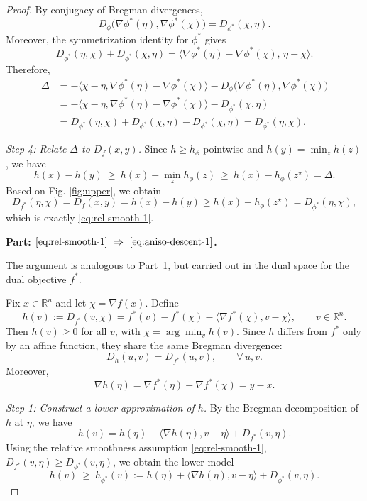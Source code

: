 \documentclass[10pt,a4paper]{amsart}
\providecommand{\paragraph}{}
\begin{document}
\begin{proof}
By conjugacy of Bregman divergences,
\[
D_\phi\bigl(\nabla\phi^*(\eta),\nabla\phi^*(\chi)\bigr)
=
D_{\phi^*}(\chi,\eta).
\]
Moreover, the symmetrization identity for $\phi^*$ gives
\[
D_{\phi^*}(\eta,\chi)+D_{\phi^*}(\chi,\eta)
=
\langle \nabla\phi^*(\eta)-\nabla\phi^*(\chi),\,\eta-\chi\rangle.
\]
Therefore,
\begin{align*}
\Delta
&=
-\langle \chi-\eta,\nabla\phi^*(\eta)-\nabla\phi^*(\chi)\rangle
- D_\phi\bigl(\nabla\phi^*(\eta),\nabla\phi^*(\chi)\bigr)\\
&=
-\langle \chi-\eta,\nabla\phi^*(\eta)-\nabla\phi^*(\chi)\rangle
- D_{\phi^*}(\chi,\eta)\\
&=
D_{\phi^*}(\eta,\chi)+D_{\phi^*}(\chi,\eta)-D_{\phi^*}(\chi,\eta)
= D_{\phi^*}(\eta,\chi).
\end{align*}

\medskip
\paragraph{\em Step 4: Relate $\Delta$ to $D_f(x,y)$.}
Since $h\ge h_\phi$ pointwise and $h(y)=\min_z h(z)$, we have
\[
h(x)-h(y)\ \ge\ h(x)-\min_z h_\phi(z)\ \ge\ h(x)-h_\phi(z^\star)=\Delta.
\]
Based on Fig. \ref{fig:upper}, we obtain
\[
D_{f^*}(\eta,\chi) = D_f(x,y)
= h(x)-h(y)
\ge h(x)-h_\phi(z^\star)
= D_{\phi^*}(\eta,\chi),
\]
which is exactly \eqref{eq:rel-smooth-1}.

\medskip
{\bf Part: $\eqref{eq:rel-smooth-1}\ \Rightarrow\ \eqref{eq:aniso-descent-1}$.}

The argument is analogous to Part~1, but carried out in the dual space for the dual objective $f^*$.

Fix $x\in\mathbb{R}^n$ and let $\chi=\nabla f(x)$. Define
\[
h(v):=D_{f^*}(v,\chi)
= f^*(v)-f^*(\chi)-\langle \nabla f^*(\chi),v-\chi\rangle,
\qquad v\in\mathbb{R}^n.
\]
Then $h(v)\ge 0$ for all $v$, with $\chi=\arg\min_v h(v)$. Since $h$ differs from $f^*$ only by an affine function, they share the same Bregman divergence:
\[
D_h(u,v)=D_{f^*}(u,v), \qquad \forall\,u,v.
\]
Moreover,
\[
\nabla h(\eta)=\nabla f^*(\eta)-\nabla f^*(\chi)=y-x.
\]

\paragraph{\em Step 1: Construct a lower approximation of $h$.}
By the Bregman decomposition of $h$ at $\eta$, we have
\[
h(v)
= h(\eta)+\langle \nabla h(\eta),v-\eta\rangle + D_{f^*}(v,\eta).
\]
Using the relative smoothness assumption \eqref{eq:rel-smooth-1},
$D_{f^*}(v,\eta)\ge D_{\phi^*}(v,\eta)$, we obtain the lower model
\begin{equation}\label{eq:key-lower-bound}
h(v)\ \ge\ h_{\phi^*}(v)
:= h(\eta)+\langle \nabla h(\eta),v-\eta\rangle + D_{\phi^*}(v,\eta).
\end{equation}


\end{proof}
\end{document}
